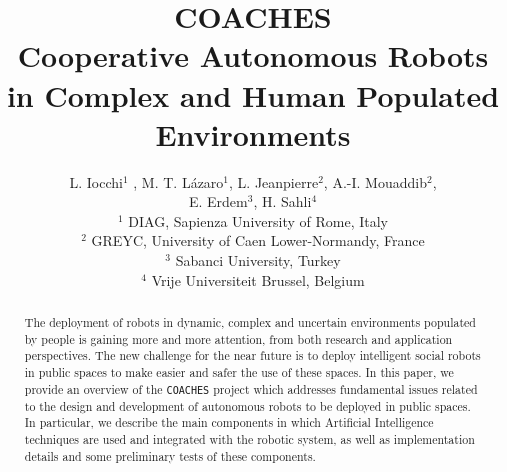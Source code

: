 \documentclass{llncs}
\def\coaches{{\tt COACHES} }
\begin{document}
%
%
%
%
\title{COACHES\\
Cooperative Autonomous Robots in Complex and Human Populated Environments}
%

\author{L. Iocchi$^1$ \Letter,  M. T. L\'azaro$^1$,  L. Jeanpierre$^2$, A.-I. Mouaddib$^2$,\\
E. Erdem$^3$, H. Sahli$^4$ \\
$\,$\\
$^1$ DIAG, %
Sapienza University of Rome, Italy\\
$^2$ GREYC, University of Caen Lower-Normandy, France\\
$^3$ Sabanci University, Turkey \\
$^4$ Vrije Universiteit Brussel, Belgium
}

\institute{}
\date{}

%
%

\maketitle              %

\begin{abstract}

The deployment of robots in dynamic, complex and uncertain environments populated by people is gaining more and more attention, from both research and application perspectives. The new challenge for the near future is to deploy intelligent social robots in public spaces to make easier and safer the use of these spaces. 
In this paper, we provide an overview of the \coaches project which addresses fundamental issues related to the design and development of autonomous robots to be deployed in public spaces. In particular, we describe the main components in which Artificial Intelligence techniques are used and integrated with the robotic system, as well as implementation details and some preliminary tests of these components. 

\end{abstract}
\end{document}
